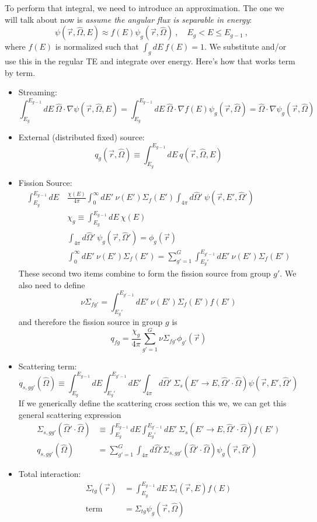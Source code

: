 \documentclass[12pt]{article}
\newcommand{\vOmega}{\ensuremath{\hat{\Omega}}}
\begin{document}
To perform that integral, we need to introduce an approximation. The one we will talk about now is \textit{assume the angular flux is separable in energy}:
\[
\psi(\vec{r}, \vOmega, E) \approx f(E)\psi_g(\vec{r}, \vOmega)\:, \quad E_g < E \leq E_{g-1}\:,
\]
where $f(E)$ is normalized such that $\int_g dE\: f(E) = 1$. We substitute and/or use this in the regular TE and integrate over energy. Here's how that works term by term.
%
\begin{itemize}
\item Streaming:
\[
\int_{E_g}^{E_{g-1}} dE\: \vOmega \cdot \nabla \psi(\vec{r}, \vOmega, E) = \int_{E_g}^{E_{g-1}} dE\: \vOmega \cdot \nabla f(E)\psi_g(\vec{r}, \vOmega) = \vOmega \cdot \nabla \psi_g(\vec{r}, \vOmega)
\]

\item External (distributed fixed) source:
\[q_{g}(\vec{r}, \vOmega) \equiv \int_{E_g}^{E_{g-1}} dE\: q(\vec{r}, \vOmega, E)\]

\item Fission Source:
\begin{align*}
\int_{E_g}^{E_{g-1}} dE\: &\frac{\chi(E)}{4 \pi}\int_0^{\infty} dE' \: \nu(E') \Sigma_f(E') \int_{4 \pi} d\vOmega' \:\psi(\vec{r}, E', \vOmega') \\
&\chi_g \equiv \int_{E_g}^{E_{g-1}} dE\: \chi(E) \\
& \int_{4 \pi} d\vOmega' \:\psi_g(\vec{r}, \vOmega') = \phi_g(\vec{r})\\
& \int_0^{\infty} dE' \: \nu(E') \Sigma_f(E') = \sum_{g'=1}^G \int_{E_g'}^{E_{g'-1}} dE'\: \nu(E') \Sigma_f(E')
\end{align*}
These second two items combine to form the fission source from group $g'$. We also need to define
\[
\nu\Sigma_{fg'} = \int_{E_g'}^{E_{g'-1}} dE'\: \nu(E') \Sigma_f(E') f(E')
\]
and therefore the fission source in group $g$ is
\[
q_{fg} = \frac{\chi_g}{4 \pi}\sum_{g'=1}^G \nu\Sigma_{fg'} \phi_{g'}(\vec{r})
\]

\item Scattering term:
\[
q_{s,gg'}(\vOmega) \equiv \int_{E_g}^{E_{g-1}} dE \int_{E_g'}^{E_{g'-1}} dE' \int_{4 \pi} d\vOmega' \: \Sigma_s(E'\rightarrow E, \vOmega' \cdot \vOmega) \psi(\vec{r}, E', \vOmega')
\]
If we generically define the scattering cross section this we, we can get this general scattering expression
\begin{align*}
\Sigma_{s,gg'}(\vOmega' \cdot \vOmega) & \equiv \int_{E_g}^{E_{g-1}} dE \int_{E_g'}^{E_{g'-1}} dE' \: \Sigma_s(E'\rightarrow E, \vOmega' \cdot \vOmega) f(E')\\
q_{s,gg'}(\vOmega) &= \sum_{g'=1}^G \int_{4 \pi} d\vOmega' \Sigma_{s,gg'}(\vOmega' \cdot \vOmega) \psi_g(\vec{r}, \vOmega')
\end{align*}

\item Total interaction:
\begin{align*}
\Sigma_{tg}(\vec{r}) &= \int_{E_g}^{E_{g-1}} dE\: \Sigma_t(\vec{r}, E)f(E)\\
\text{term }&= \Sigma_{tg} \psi_g(\vec{r}, \vOmega)
\end{align*}

\end{itemize}
\end{document}
